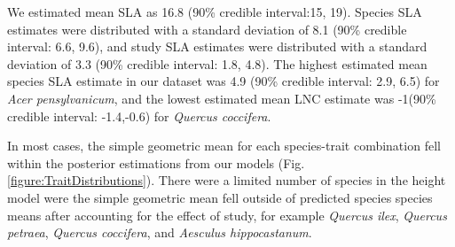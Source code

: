 \documentclass{article}\usepackage[]{graphicx}\usepackage[]{color}
\begin{document}
We estimated mean SLA as 16.8 (90\% credible interval:15, 19). Species SLA estimates were distributed with a standard deviation  of 8.1 (90\% credible interval: 6.6, 9.6), and study SLA estimates were distributed with a standard deviation  of 3.3 (90\% credible interval: 1.8, 4.8). The highest estimated mean species SLA estimate in our dataset was 4.9 (90\% credible interval: 2.9, 6.5) for \textit{Acer pensylvanicum}, and the lowest estimated mean LNC estimate was -1(90\% credible interval: -1.4,-0.6) for \textit{Quercus coccifera}.

In most cases, the simple geometric mean for each species-trait combination fell within the posterior estimations from our models (Fig. \ref{figure:TraitDistributions}). There were a limited number of species in the height model were the simple geometric mean fell outside of predicted species species means after accounting for the effect of study, for example \textit{Quercus ilex}, \textit{Quercus petraea}, \textit{Quercus coccifera}, and \textit{Aesculus hippocastanum}.


\end{document}
